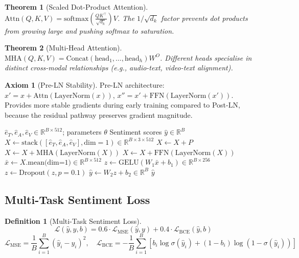 \documentclass[12pt,a4paper]{article}
\theoremstyle{definition}
\newtheorem{definition}{Definition}[section]
\newtheorem{axiom}{Axiom}[section]
\theoremstyle{plain}
\newtheorem{theorem}{Theorem}[section]
\theoremstyle{remark}
\newcommand{\R}{\mathbb{R}}
\newcommand{\softmax}{\mathrm{softmax}}
\newcommand{\LN}{\mathrm{LayerNorm}}
\newcommand{\GELU}{\mathrm{GELU}}
\newcommand{\MHA}{\mathrm{MHA}}
\begin{document}
\begin{theorem}[Scaled Dot-Product Attention]
$\text{Attn}(Q,K,V) = \softmax\!\left(\frac{QK^\top}{\sqrt{d_k}}\right)V$. The $1/\sqrt{d_k}$ factor prevents dot products from growing large and pushing softmax to saturation.
\end{theorem}

\begin{theorem}[Multi-Head Attention]
$\MHA(Q,K,V) = \text{Concat}(\text{head}_1,\ldots,\text{head}_h)W^O$. Different heads specialise in distinct cross-modal relationships (e.g., audio-text, video-text alignment).
\end{theorem}

\begin{axiom}[Pre-LN Stability]
Pre-LN architecture: $x' = x + \text{Attn}(\LN(x))$, $x'' = x' + \text{FFN}(\LN(x'))$. Provides more stable gradients during early training compared to Post-LN, because the residual pathway preserves gradient magnitude.
\end{axiom}

\begin{algorithm}[H]
\caption{MultimodalFusionTransformer.forward}
\label{alg:fusion_forward}
\begin{algorithmic}[1]
\Require $\hat{e}_T, \hat{e}_A, \hat{e}_V \in \R^{B \times 512}$; parameters $\theta$
\Ensure Sentiment scores $\hat{y} \in \R^B$
\State $X \gets \text{stack}([\hat{e}_T, \hat{e}_A, \hat{e}_V], \text{dim}=1) \in \R^{B \times 3 \times 512}$
\State $X \gets X + P$ 
  \State $X \gets X + \MHA(\LN(X))$ 
  \State $X \gets X + \text{FFN}(\LN(X))$ 
\EndFor
\State $\bar{x} \gets X.\text{mean(dim=1)} \in \R^{B \times 512}$
\State $z \gets \GELU(W_1 \bar{x} + b_1) \in \R^{B \times 256}$
\State $z \gets \text{Dropout}(z, p=0.1)$
\State $\hat{y} \gets W_2 z + b_2 \in \R^B$
\State \Return $\hat{y}$
\end{algorithmic}
\end{algorithm}

\subsection{Multi-Task Sentiment Loss}

\begin{definition}[Multi-Task Sentiment Loss]
\[
  \mathcal{L}(\hat{y}, y, b) = 0.6 \cdot \mathcal{L}_{\text{MSE}}(\hat{y}, y) + 0.4 \cdot \mathcal{L}_{\text{BCE}}(\hat{y}, b)
\]
\[
  \mathcal{L}_{\text{MSE}} = \frac{1}{B}\sum_{i=1}^B (\hat{y}_i - y_i)^2, \quad
  \mathcal{L}_{\text{BCE}} = -\frac{1}{B}\sum_{i=1}^B [b_i \log\sigma(\hat{y}_i) + (1-b_i)\log(1-\sigma(\hat{y}_i))]
\]
\end{definition}
\end{document}

